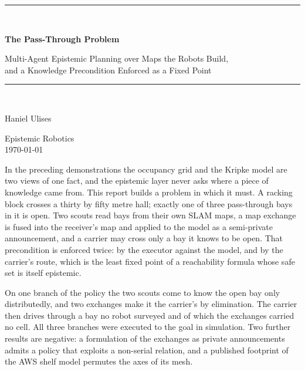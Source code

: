 \documentclass[11pt,a4paper]{article}
\theoremstyle{definition}
\begin{document}
\begin{titlepage}
\centering
\vspace*{2.4cm}
{\color{rulegrey}\rule{\textwidth}{0.8pt}}\\[0.9cm]
{\LARGE\bfseries The Pass-Through Problem\par}
\vspace{0.5cm}
{\large\color{slate} Multi-Agent Epistemic Planning over Maps the Robots Build,\\
and a Knowledge Precondition Enforced as a Fixed Point\par}
\vspace{0.7cm}
{\color{rulegrey}\rule{\textwidth}{0.8pt}}\\[1.4cm]

{\large Haniel Ulises\par}
\vspace{0.3cm}
{\color{slate} Epistemic Robotics}\\
\vspace{0.15cm}
{\color{slate}\today}

\vfill
{\color{slate}\small
In the preceding demonstrations the occupancy grid and the Kripke model are two
views of one fact, and the epistemic layer never asks where a piece of
knowledge came from. This report builds a problem in which it must. A racking
block crosses a thirty by fifty metre hall; exactly one of three pass-through
bays in it is open. Two scouts read bays from their own SLAM maps, a map
exchange is fused into the receiver's map and applied to the model as a
semi-private announcement, and a carrier may cross only a bay it knows to be
open. That precondition is enforced twice: by the executor against the model,
and by the carrier's route, which is the least fixed point of a reachability
formula whose safe set is itself epistemic.

\vspace{0.6em}
On one branch of the policy the two scouts come to know the open bay only
distributedly, and two exchanges make it the carrier's by elimination. The
carrier then drives through a bay no robot surveyed and of which the exchanges
carried no cell. All three branches were executed to the goal in simulation.
Two further results are negative: a formulation of the exchanges as private
announcements admits a policy that exploits a non-serial relation, and a
published footprint of the AWS shelf model permutes the axes of its mesh.}
\vspace{1.2cm}
\end{titlepage}
\end{document}
